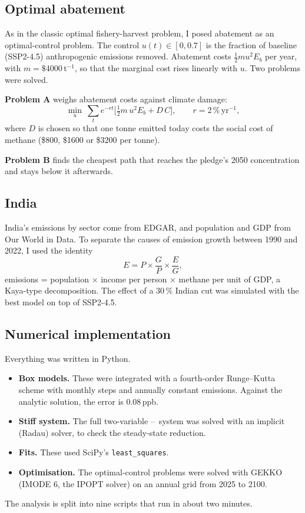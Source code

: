 \documentclass[11pt,a4paper]{article}
\newcommand{\CH}{\ce{CH4}}
\newcommand{\OH}{\ce{OH}}
\begin{document}
\subsection{Optimal abatement}
As in the classic optimal fishery-harvest problem, I posed abatement as an optimal-control problem. The control $u(t)\in[0,0.7]$ is the fraction of baseline (SSP2-4.5) anthropogenic emissions removed. Abatement costs $\tfrac12 m u^2E_b$ per year, with $m=\$4000$\,t$^{-1}$, so that the marginal cost rises linearly with $u$. Two problems were solved.

\textbf{Problem A} weighs abatement costs against climate damage:
\begin{equation}
\min_u\ \sum_t e^{-rt}\Big[\tfrac12 m\,u^2E_b+D\,C\Big],\qquad r=2\,\%\,\text{yr}^{-1},
\end{equation}
where $D$ is chosen so that one tonne emitted today costs the social cost of methane (\$800, \$1600 or \$3200 per tonne).

\textbf{Problem B} finds the cheapest path that reaches the pledge's 2050 concentration and stays below it afterwards.

\subsection{India}
India's emissions by sector come from EDGAR, and population and GDP from Our World in Data. To separate the causes of emission growth between 1990 and 2022, I used the identity
\begin{equation}
E=P\times\frac{G}{P}\times\frac{E}{G},
\end{equation}
emissions = population $\times$ income per person $\times$ methane per unit of GDP, a Kaya-type decomposition. The effect of a 30\,\% Indian cut was simulated with the best model on top of SSP2-4.5.

\subsection{Numerical implementation}
Everything was written in Python.
\begin{itemize}\itemsep0pt
\item \textbf{Box models.} These were integrated with a fourth-order Runge--Kutta scheme with monthly steps and annually constant emissions. Against the analytic solution, the error is 0.08\,ppb.
\item \textbf{Stiff system.} The full two-variable \CH--\OH\ system was solved with an implicit (Radau) solver, to check the steady-state reduction.
\item \textbf{Fits.} These used SciPy's \texttt{least\_squares}.
\item \textbf{Optimisation.} The optimal-control problems were solved with GEKKO (IMODE 6, the IPOPT solver) on an annual grid from 2025 to 2100.
\end{itemize}
The analysis is split into nine scripts that run in about two minutes.
\end{document}
